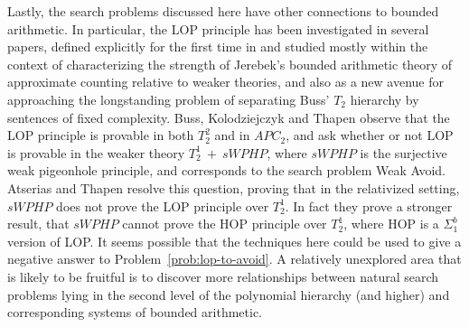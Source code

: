 \documentclass[11pt]{article}
\newtheorem{definition}{Definition}
\newcommand{\todo}[1]{\textcolor{red}{TODO: #1}}
\newcommand{\B}{\{0,1\}}
\newcommand{\rng}{\mathrm{range}}
\begin{document}
Lastly, the search problems discussed here have other connections to bounded arithmetic.
In particular, the LOP principle has been investigated in several papers, defined explicitly for the first time in \cite{Chiari1998-CHIWFI} and studied mostly within the context of characterizing the  strength of Jerebek's bounded arithmetic theory of approximate counting relative to weaker theories, and also as a new avenue for approaching the longstanding problem of separating Buss' $T_2$ hierarchy by sentences of fixed complexity. 
Buss, Kolodziejczyk and Thapen \cite{BussKT14} observe that the LOP principle is provable in both
$T^2_2$ and in $APC_2$, and ask whether or not  
LOP is provable in the weaker theory $T^1_2 ~ + ~ sWPHP$, 
where $sWPHP$ is the surjective weak pigeonhole principle, and corresponds to the search problem Weak Avoid.
Atserias and Thapen \cite{AtseriasT13} resolve this question,
proving that in the relativized setting,
$sWPHP$ does not prove the LOP principle over $T^1_2$.
In fact they prove a stronger result, that 
$sWPHP$ cannot prove the HOP principle over $T^1_2$,
where HOP is a
$\Sigma_1^b$ version of LOP. 
It seems possible that the techniques here could be used to give a negative answer to Problem~\ref{prob:lop-to-avoid}.
A relatively unexplored area that is likely to be fruitful is to discover more relationships between natural search problems lying in the second level of the polynomial hierarchy (and higher) and corresponding systems of bounded arithmetic. 






\end{document}
